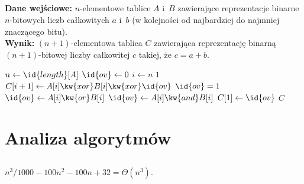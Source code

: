 \subsection{} %
\noindent\textbf{Dane wejściowe:} $n$-elementowe tablice $A$ i~$B$ zawierające reprezentacje binarne $n$-bitowych liczb całkowitych $a$ i~$b$ (w kolejności od najbardziej do najmniej znaczącego bitu). \\ 
\textbf{Wynik:} $(n+1)$-elementowa tablica $C$ zawierająca reprezentację binarną $(n+1)$-bitowej liczby całkowitej $c$ takiej, że $c=a+b$.
\begin{codebox}
\li	$n\gets\id{length}[A]$
\li	$\id{ov}\gets0$
\li	\For $i\gets n$ \Downto $1$ \label{li:bin-add-for2-begin}
\li		\Do
			$C[i+1]\gets A[i]\kw{xor}B[i]\kw{xor}\id{ov}$ \label{li:bin-add-xor}
\li			\If $\id{ov}=1$ \label{li:bin-add-if}
\li				\Then
					$\id{ov}\gets A[i]\kw{or}B[i]$
\li				\Else
					$\id{ov}\gets A[i]\kw{and}B[i]$
				\End
		\End \label{li:bin-add-for2-end}
\li	$C[1]\gets\id{ov}$
\li	\Return $C$
\end{codebox}

\section{Analiza algorytmów}

\subsection{} %
\begin{center}
	$n^3\!/1000-100n^2-100n+32=\Theta(n^3).$
\end{center}

